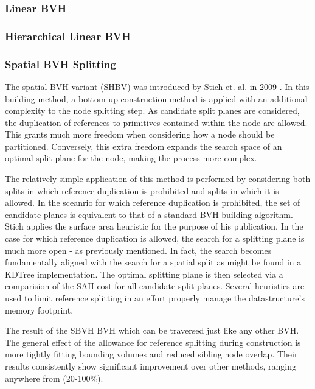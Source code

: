 \documentclass[12pt, a4paper]{article}
\begin{document}
\subsubsection{Linear BVH}%

\subsubsection{Hierarchical Linear BVH}%

\subsubsection{Spatial BVH Splitting}%

The spatial BVH variant (SHBV) was introduced by Stich et. al. in 2009 \cite{sbvh}. In this building method, a bottom-up construction method is applied with an additional complexity to the node splitting step. As candidate split planes are considered, the duplication of references to primitives contained within the node are allowed. This grants much more freedom when considering how a node should be partitioned. Conversely, this extra freedom expands the search space of an optimal split plane for the node, making the process more complex.

The relatively simple application of this method is performed by considering both splits in which reference duplication is prohibited and splits in which it is allowed. In the sceanrio for which reference duplication is prohibited, the set of candidate planes is equivalent to that of a standard BVH building algorithm. Stich applies the surface area heuristic for the purpose of his publication. In the case for which reference duplication is allowed, the search for a splitting plane is much more open - as previously mentioned. In fact, the search becomes fundamentally aligned with the search for a spatial split as might be found in a KDTree implementation. The optimal splitting plane is then selected via a comparision of the SAH cost for all candidate split planes. Several heuristics are used to limit reference splitting in an effort properly manage the datastructure's memory footprint.

The result of the SBVH BVH which can be traversed just like any other BVH. The general effect of the allowance for reference splitting during construction is more tightly fitting bounding volumes and reduced sibling node overlap. Their results consistently show significant improvement over other methods, ranging anywhere from (20-100\%).
\end{document}
